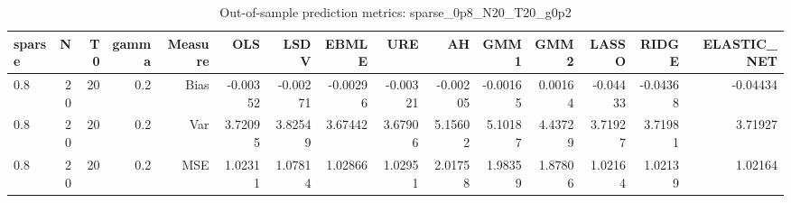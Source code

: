 \begin{table}[!htbp]\centering
\caption{Out-of-sample prediction metrics: sparse_0p8_N20_T20_g0p2}
\label{tab:table3_sparse_0p8_N20_T20_g0p2}
\begin{tabular}{lrrrrrrrrrrrrrr}
\hline
sparse & N & T0 & gamma & Measure & OLS & LSDV & EBMLE & URE & AH & GMM1 & GMM2 & LASSO & RIDGE & ELASTIC_NET \\
\hline
0.8 & 20 & 20 & 0.2 & Bias & -0.00352 & -0.00271 & -0.00296 & -0.00321 & -0.00205 & -0.00165 & 0.00164 & -0.04433 & -0.04368 & -0.04434 \\
0.8 & 20 & 20 & 0.2 & Var & 3.72095 & 3.82549 & 3.67442 & 3.67906 & 5.15602 & 5.10187 & 4.43729 & 3.71927 & 3.71981 & 3.71927 \\
0.8 & 20 & 20 & 0.2 & MSE & 1.02311 & 1.07814 & 1.02866 & 1.02951 & 2.01758 & 1.98359 & 1.87806 & 1.02164 & 1.02139 & 1.02164 \\
\hline
\end{tabular}
\end{table}

